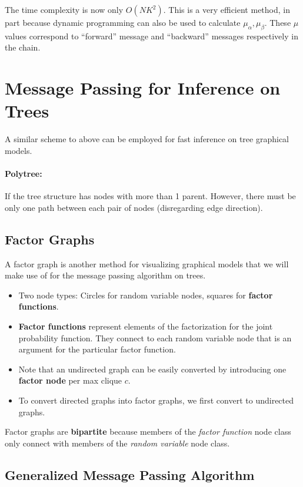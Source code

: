 \documentclass[a4paper,12pt]{report}
\begin{document}
The time complexity is now only $O(NK^2)$. This is a very efficient method, in part because dynamic programming can also be used to calculate $\mu_\alpha, \mu_\beta$. These $\mu$ values correspond to ``forward'' message and ``backward'' messages respectively in the chain.


\section{Message Passing for Inference on Trees}

A similar scheme to above can be employed for fast inference on tree graphical models. 

\paragraph{Polytree: } If the tree structure has nodes with more than 1 parent. However, there must be only one path between each pair of nodes (disregarding edge direction). 

\subsection{Factor Graphs}

A factor graph is another method for visualizing graphical models that we will make use of for the message passing algorithm on trees. 
\begin{itemize} 
\item Two node types: Circles for random variable nodes, squares for \textbf{factor functions}.
\item \textbf{Factor functions} represent elements of the factorization for the joint probability function. They connect to each random variable node that is an argument for the particular factor function.
\item Note that an undirected graph can be easily converted by introducing one \textbf{factor node} per max clique $c$. 
\item To convert directed graphs into factor graphs, we first convert to undirected graphs. 
\end{itemize}

Factor graphs are \textbf{bipartite} because members of the \textit{factor function} node class only connect with members of the \textit{random variable} node class.

\subsection{Generalized Message Passing Algorithm}
\end{document}
